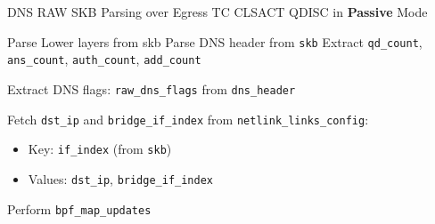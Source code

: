 \documentclass [11pt, proquest] {uwthesis}[2020/02/24]
\begin{document}
\begin{algorithm}[H]
\caption{DNS RAW SKB Parsing over Egress TC CLSACT QDISC in \textbf{Passive} Mode }
\label{sec:alg4}

\small %


Parse Lower layers from skb
% 
Parse DNS header from \texttt{skb}\;
Extract \texttt{qd\_count}, \texttt{ans\_count}, \texttt{auth\_count}, \texttt{add\_count}\;


Extract DNS flags: \texttt{raw\_dns\_flags} from \texttt{dns\_header}\;



Fetch \texttt{dst\_ip} and \texttt{bridge\_if\_index} from \texttt{netlink\_links\_config}:
\begin{itemize}[nosep]
    \item Key: \texttt{if\_index} (from \texttt{skb})
    \item Values: \texttt{dst\_ip}, \texttt{bridge\_if\_index}
\end{itemize}

Perform \texttt{bpf\_map\_updates}

\end{algorithm}
\end{document}
